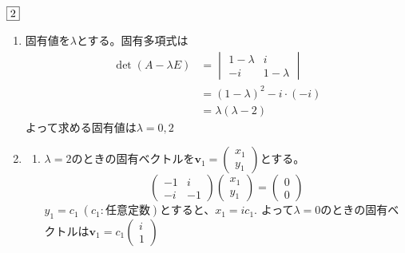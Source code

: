\documentclass[dvipdfmx]{jsreport}
\begin{document}
\begin{souanswer} %
	$\fbox{2}$ 
\begin{enumerate}
	\item 固有値を$\lambda$とする。固有多項式は
\begin{align*}
	\det{(A- \lambda E)}
&= \begin{vmatrix}
	1- \lambda& i\\
	-i& 1- \lambda
\end{vmatrix}\\
&= (1- \lambda)^2- i\cdot (-i)\\
&= \lambda(\lambda- 2)
\end{align*}
	よって求める固有値は$\lambda= 0, 2$
	\item 
\begin{enumerate}
	\item $\lambda= 2$のときの固有ベクトルを$\bm{v}_1=\begin{pmatrix}x_1\\ y_1\end{pmatrix}$とする。
\begin{equation*}
	\begin{pmatrix}-1& i\\ -i& -1\end{pmatrix}\begin{pmatrix}x_1\\ y_1\end{pmatrix}= \begin{pmatrix}0\\ 0\end{pmatrix}
\end{equation*}
	$y_1= c_1\ (c_1\colon 任意定数)$とすると、$x_1= ic_1$.
	よって$\lambda= 0$のときの固有ベクトルは$\bm{v}_1= c_1\begin{pmatrix}i\\ 1\end{pmatrix}$


\end{enumerate}
\end{enumerate}
\end{souanswer}
\end{document}
